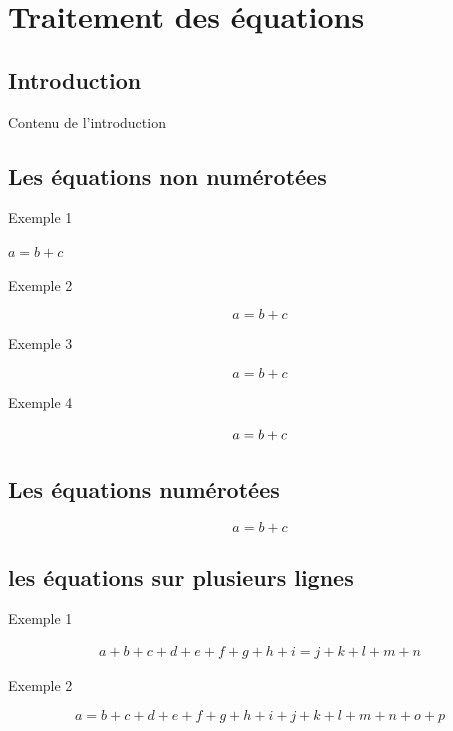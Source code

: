 \chapter{Traitement des équations}

\section{Introduction}
Contenu de l'introduction

\section{Les équations non numérotées}

Exemple 1

$
a = b + c
$
\vspace{1cm}

Exemple 2

$$
a = b + c
$$
\vspace{1cm}


Exemple 3

\[
a = b + c
\]


\vspace{1cm}

Exemple 4

\begin{equation*}
\centering
a = b + c
\end{equation*}




\section{Les équations numérotées}

\begin{equation}
a = b + c
\end{equation}


\section{les équations sur plusieurs lignes}

Exemple 1

\begin{multline}
a + b + c + d + e + f
+ g + h + i
= j + k + l + m + n
\end{multline}

\vspace{1cm}

Exemple 2

\begin{equation}
a = b + c + d + e + f
+ g + h + i + j
+ k + l + m + n + o + p
\label{eq:equation_too_long}
\end{equation}

